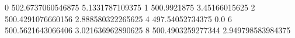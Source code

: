 0 502.6737060546875 5.1331787109375
1 500.9921875 3.45166015625
2 500.4291076660156 2.888580322265625
4 497.54052734375 0.0
6 500.5621643066406 3.021636962890625
8 500.4903259277344 2.949798583984375
